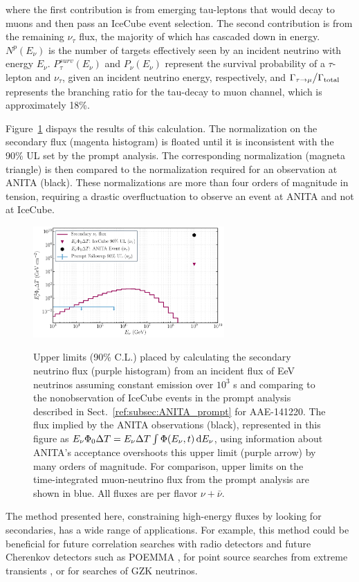 where the first contribution is from emerging tau-leptons that would decay to muons and then pass an IceCube event selection. The second contribution is from the remaining $\nu_{\tau}$ flux, the majority of which has cascaded down in energy. $N^{p} (E_{\nu})$ is the number of targets effectively seen by an incident neutrino with energy $E_{\nu}$. $P _ { \tau } ^ { s u r v } \left( E _ { \nu } \right)$ and $P _ { \nu }(E _ { \nu })$ represent the survival probability of a $\tau$-lepton and $\nu_{\tau}$, given an incident neutrino energy, respectively, and $\Gamma_{\tau\rightarrow\mu}\big/\Gamma_{\rm{total}}$ represents the branching ratio for the tau-decay to muon channel, which is approximately 18\%.

Figure~\ref{fig:ANITA_taurunner_limits} dispays the results of this calculation. The normalization on the secondary \nutau flux (magenta histogram) is floated until it is inconsistent with the 90\% UL set by the prompt analysis. The corresponding normalization (magneta triangle) is then compared to the normalization required for an observation at ANITA (black). These normalizations are more than four orders of magnitude in tension, requiring a drastic overfluctuation to observe an event at ANITA and not at IceCube. 

\begin{figure}
\centering
  \includegraphics[width=0.65\textwidth]{figures/ANITA/ANITA_pspaper_secondaries_NOpreliminary_deltaT.pdf}
  \label{fig:ANITA_taurunner_limits}
  \caption[ANITA secondary fluxes]{Upper limits (90\% C.L.) placed by calculating the secondary neutrino flux (purple histogram) from an incident flux of EeV neutrinos assuming constant emission over $10^3$ s and comparing to the nonobservation of IceCube events in the prompt analysis described in Sect.~\ref{ref:subsec:ANITA_prompt} for AAE-141220. The flux implied by the ANITA observations (black), represented in this figure as $E_{\nu}\Phi_0 \Delta T = E_{\nu} \Delta T \int \Phi(E_{\nu}, t) \mathop{}\!\mathrm{d} E_{\nu}$, using information about ANITA's acceptance \citep{Romero-Wolf:2018zxt} overshoots this upper limit (purple arrow) by many orders of magnitude. For comparison, upper limits on the time-integrated muon-neutrino flux from the prompt analysis are shown in blue. All fluxes are per flavor $\nu + \bar{\nu}$.}
\end{figure}

The method presented here, constraining high-energy fluxes by looking for secondaries, has a wide range of applications. For example, this method could be beneficial for future correlation searches with radio detectors and future Cherenkov detectors such as POEMMA \citep{Venters:2019xwi}, for point source searches from extreme transients \citep{Righi:2020ufi}, or for searches of GZK neutrinos.


